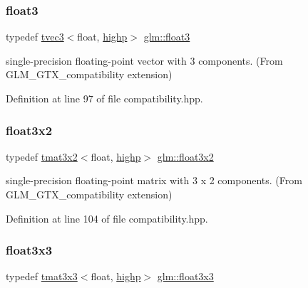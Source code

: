 \subsubsection{\texorpdfstring{float3}{float3}}
{\footnotesize\ttfamily typedef \mbox{\hyperlink{structglm_1_1tvec3}{tvec3}}$<$float, \mbox{\hyperlink{namespaceglm_a0f04f086094c747d227af4425893f545ac6f7eab42eacbb10d59a58e95e362074}{highp}}$>$ \mbox{\hyperlink{group__gtx__compatibility_ga25f20d2c12f9b5f3917467e92899ea5a}{glm\+::float3}}}



single-\/precision floating-\/point vector with 3 components. (From G\+L\+M\+\_\+\+G\+T\+X\+\_\+compatibility extension) 



Definition at line 97 of file compatibility.\+hpp.

\mbox{\label{group__gtx__compatibility_ga2d2b535c9bad9274456ae12676bc6865}} 
\subsubsection{\texorpdfstring{float3x2}{float3x2}}
{\footnotesize\ttfamily typedef \mbox{\hyperlink{structglm_1_1tmat3x2}{tmat3x2}}$<$float, \mbox{\hyperlink{namespaceglm_a0f04f086094c747d227af4425893f545ac6f7eab42eacbb10d59a58e95e362074}{highp}}$>$ \mbox{\hyperlink{group__gtx__compatibility_ga2d2b535c9bad9274456ae12676bc6865}{glm\+::float3x2}}}



single-\/precision floating-\/point matrix with 3 x 2 components. (From G\+L\+M\+\_\+\+G\+T\+X\+\_\+compatibility extension) 



Definition at line 104 of file compatibility.\+hpp.

\mbox{\label{group__gtx__compatibility_ga75c991509a4c4894f10ab480f89e39e7}} 
\subsubsection{\texorpdfstring{float3x3}{float3x3}}
{\footnotesize\ttfamily typedef \mbox{\hyperlink{structglm_1_1tmat3x3}{tmat3x3}}$<$float, \mbox{\hyperlink{namespaceglm_a0f04f086094c747d227af4425893f545ac6f7eab42eacbb10d59a58e95e362074}{highp}}$>$ \mbox{\hyperlink{group__gtx__compatibility_ga75c991509a4c4894f10ab480f89e39e7}{glm\+::float3x3}}}



